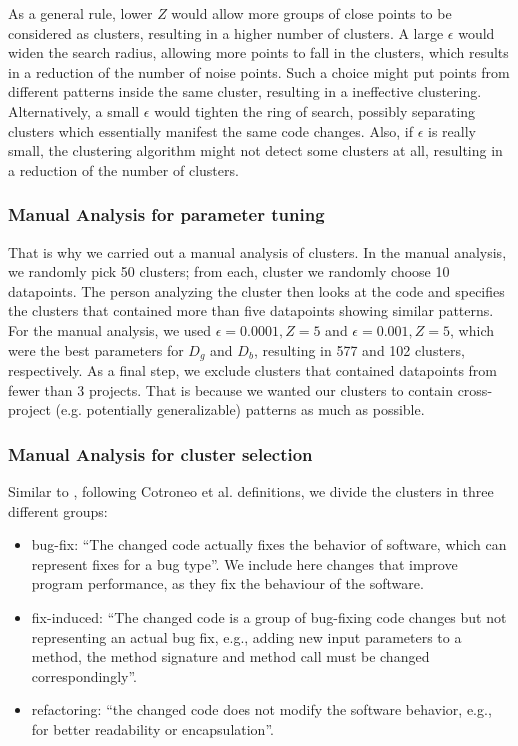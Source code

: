 As a general rule, lower $Z$ would allow more groups of close points to be considered as clusters, resulting in a higher number of clusters. A large $\epsilon$ would widen the search radius, allowing more points to fall in the clusters, which results in a reduction of the number of noise points. Such a choice might put points from different patterns inside the same cluster, resulting in a ineffective clustering. Alternatively, a small $\epsilon$ would tighten the ring of search, possibly separating clusters which essentially manifest the same code changes. Also, if $\epsilon$ is really small, the clustering algorithm might not detect some clusters at all, resulting in a reduction of the number of clusters. 

\subsubsection{\label{sec:manual_analysis_parameter_tuning}Manual Analysis for parameter tuning}

That is why we carried out a manual analysis of clusters. In the manual analysis, we randomly pick 50 clusters; from each, cluster we randomly choose 10 datapoints. The person analyzing the cluster then looks at the code and specifies the clusters that contained more than five datapoints showing similar patterns. For the manual analysis, we used $\epsilon=0.0001, Z=5$ and $\epsilon=0.001, Z=5$, which were the best parameters for $D_g$ and $D_b$, resulting in 577 and 102 clusters, respectively. As a final step, we exclude clusters that contained datapoints from fewer than 3 projects. That is because we wanted our clusters to contain cross-project (e.g. potentially generalizable) patterns as much as possible.  

\subsubsection{\label{sec:manual_analysis_cluster_selection}Manual Analysis for cluster selection}

Similar to \cite{yang2022mining}, following Cotroneo et al. \cite{cotroneo2019analyzing} definitions, we divide the clusters in three different groups:

\begin{itemize}
    \item bug-fix: ``The changed code actually fixes the behavior of software, which can represent fixes for a bug type''. We include here changes that improve program performance, as they fix the behaviour of the software.
    
    \item fix-induced: ``The changed code is a group of bug-fixing code changes but not representing an actual bug fix, e.g., adding new input parameters to a method, the method signature and method call must be changed correspondingly''.
    
    \item refactoring: ``the changed code does not modify the software behavior, e.g., for better readability or encapsulation''.
\end{itemize}

